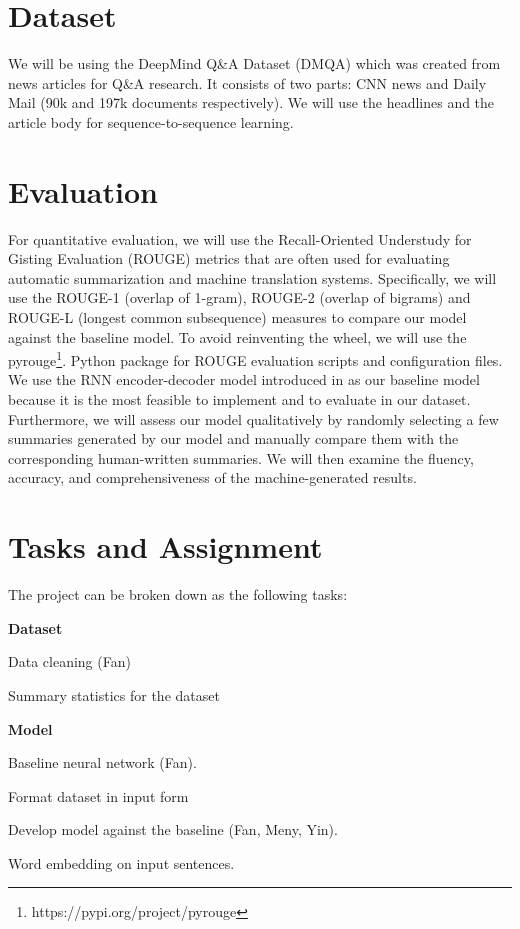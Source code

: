 \section{Dataset}

We will be using the DeepMind Q\&A Dataset (DMQA) which was created from news articles for Q\&A research. It consists of two parts: CNN news and Daily Mail (90k and 197k documents respectively). We will use the headlines and the article body for sequence-to-sequence learning.


\section{Evaluation}
For quantitative evaluation, we will use the Recall-Oriented Understudy for Gisting Evaluation (ROUGE) metrics that are often used for evaluating automatic summarization and machine translation systems. Specifically, we will use the ROUGE-1 (overlap of 1-gram), ROUGE-2 (overlap of bigrams) and ROUGE-L (longest common subsequence) measures to compare our model against the baseline model. To avoid reinventing the wheel, we will use the pyrouge\footnote{https://pypi.org/project/pyrouge}. Python package for ROUGE evaluation scripts and configuration files. 
We use the RNN encoder-decoder model introduced in \cite{cho2014learning} as our baseline model because it is the most feasible to implement and to evaluate in our dataset. Furthermore, we will assess our model qualitatively by randomly selecting a few summaries generated by our model and manually compare them with the corresponding human-written summaries. We will then examine the fluency, accuracy, and comprehensiveness of the machine-generated results.

\section{Tasks and Assignment}

The project can be broken down as the following tasks:

\noindent
\textbf{Dataset}
\begin{compactitem}
\item Data cleaning (Fan)
\item Summary statistics for the dataset
\end{compactitem}

\noindent
\textbf{Model}
\begin{compactitem}
\item Baseline neural network (Fan).
\item Format dataset in input form 
\item Develop model against the baseline (Fan, Meny, Yin).
\item Word embedding on input sentences.
\end{compactitem}

